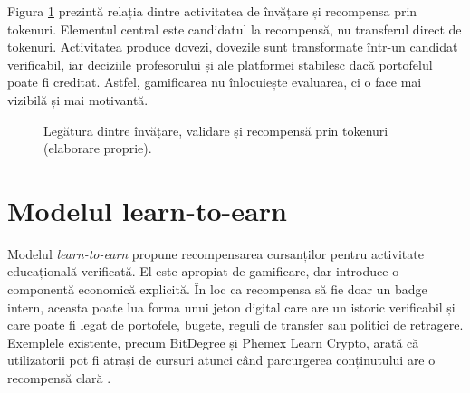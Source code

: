 Figura \ref{fig:motivatie_recompensa} prezintă relația dintre activitatea de învățare și recompensa prin tokenuri. Elementul central este candidatul la recompensă, nu transferul direct de tokenuri. Activitatea produce dovezi, dovezile sunt transformate într-un candidat verificabil, iar deciziile profesorului și ale platformei stabilesc dacă portofelul poate fi creditat. Astfel, gamificarea nu înlocuiește evaluarea, ci o face mai vizibilă și mai motivantă.

\begin{figure}[H]
    \centering
    \caption{Legătura dintre învățare, validare și recompensă prin tokenuri (elaborare proprie).}
    \label{fig:motivatie_recompensa}
\end{figure}

\section{Modelul learn-to-earn}
Modelul \textit{learn-to-earn} propune recompensarea cursanților pentru activitate educațională verificată. El este apropiat de gamificare, dar introduce o componentă economică explicită. În loc ca recompensa să fie doar un badge intern, aceasta poate lua forma unui jeton digital care are un istoric verificabil și care poate fi legat de portofele, bugete, reguli de transfer sau politici de retragere. Exemplele existente, precum BitDegree și Phemex Learn Crypto, arată că utilizatorii pot fi atrași de cursuri atunci când parcurgerea conținutului are o recompensă clară \cite{bitdegree,phemex}.

